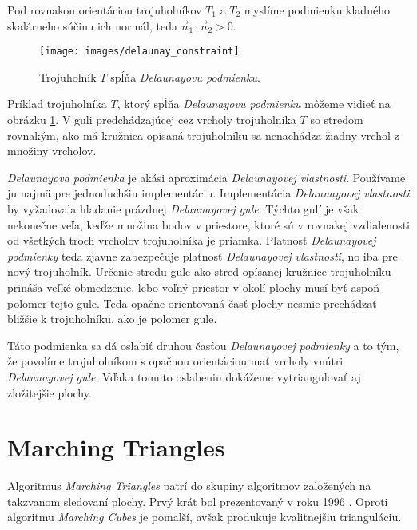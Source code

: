     Pod rovnakou orientáciou 
    trojuholníkov $T_1$ a $T_2$ myslíme podmienku kladného skalárneho súčinu ich normál, teda 
    $\vec{n}_1 \cdot \vec{n}_2 > 0$.

\begin{figure}
    \centerline{\texttt{[image: images/delaunay\_constraint]}}
    \caption[Trojuholník $T$ spĺňajúci Delaunayovu podmienku]
    {\cite{hilton1996marching} Trojuholník $T$ spĺňa \textit{Delaunayovu podmienku}.}
    \label{obr:delaunay_constraint}
\end{figure}

Príklad trojuholníka $T$, ktorý spĺňa \textit{Delaunayovu podmienku} môžeme vidieť na obrázku 
\ref{obr:delaunay_constraint}. V guli predchádzajúcej cez vrcholy trojuholníka $T$ so stredom 
rovnakým, ako má kružnica opísaná trojuholníku sa nenachádza žiadny vrchol z množiny vrcholov.

\textit{Delaunayova podmienka} je akási aproximácia \textit{Delaunayovej vlastnosti}. Používame ju najmä pre jednoduchšiu
implementáciu. Implementácia \textit{Delaunayovej vlastnosti} by vyžadovala
hľadanie prázdnej \textit{Delaunayovej gule}. Týchto gulí je však nekonečne veľa, keďže množina
bodov v priestore, ktoré sú v rovnakej vzdialenosti od všetkých troch vrcholov trojuholníka je priamka.
Platnosť \textit{Delaunayovej podmienky} teda zjavne zabezpečuje platnosť \textit{Delaunayovej vlastnosti}, 
no iba pre nový trojuholník.
Určenie stredu gule ako stred opísanej kružnice trojuholníku prináša veľké obmedzenie,
lebo voľný priestor v okolí plochy musí byť aspoň polomer tejto gule. Teda opačne orientovaná
časť plochy nesmie prechádzať bližšie k trojuholníku, ako je polomer gule.

Táto podmienka sa dá oslabiť druhou časťou
\textit{Delaunayovej podmienky} a to tým, že povolíme trojuholníkom s opačnou orientáciou mať vrcholy vnútri
\textit{Delaunayovej gule}. Vďaka tomuto oslabeniu dokážeme vytriangulovať aj zložitejšie plochy.


\section{Marching Triangles}

\label{kap:marching_triangles}

Algoritmus \textit{Marching Triangles} patrí do skupiny algoritmov založených na takzvanom 
sledovaní plochy. Prvý krát bol prezentovaný v roku 1996 \cite{hilton1996marching}. 
Oproti algoritmu \textit{Marching Cubes} je pomalší, avšak produkuje kvalitnejšiu trianguláciu. 

